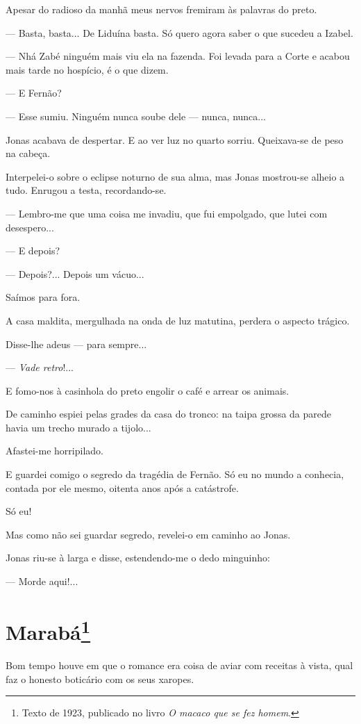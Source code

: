 Apesar do radioso da manhã meus nervos fremiram às palavras do preto.

--- Basta, basta... De Liduína basta. Só quero agora saber o que sucedeu
a Izabel.

--- Nhá Zabé ninguém mais viu ela na fazenda. Foi levada para a Corte e
acabou mais tarde no hospício, é o que dizem.

--- E Fernão?

--- Esse sumiu. Ninguém nunca soube dele --- nunca, nunca...

Jonas acabava de despertar. E ao ver luz no quarto sorriu. Queixava-se
de peso na cabeça.

Interpelei-o sobre o eclipse noturno de sua alma, mas Jonas mostrou-se
alheio a tudo. Enrugou a testa, recordando-se.

--- Lembro-me que uma coisa me invadiu, que fui empolgado, que lutei com
desespero...

--- E depois?

--- Depois?... Depois um vácuo...

Saímos para fora.

A casa maldita, mergulhada na onda de luz matutina, perdera o aspecto
trágico.

Disse-lhe adeus --- para sempre...

--- \emph{Vade retro}!...

E fomo-nos à casinhola do preto engolir o café e arrear os animais.

De caminho espiei pelas grades da casa do tronco: na taipa grossa da
parede havia um trecho murado a tijolo...

Afastei-me horripilado.

E guardei comigo o segredo da tragédia de Fernão. Só eu no mundo a
conhecia, contada por ele mesmo, oitenta anos após a catástrofe.

Só eu!

Mas como não sei guardar segredo, revelei-o em caminho ao Jonas.

Jonas riu-se à larga e disse, estendendo-me o dedo minguinho:

--- Morde aqui!...

\chapter{Marabá\footnote[*]{Texto de 1923, publicado no livro \emph{O macaco que se fez homem}.}}

Bom tempo houve em que o romance era coisa de aviar com receitas à
vista, qual faz o honesto boticário com os seus xaropes.

